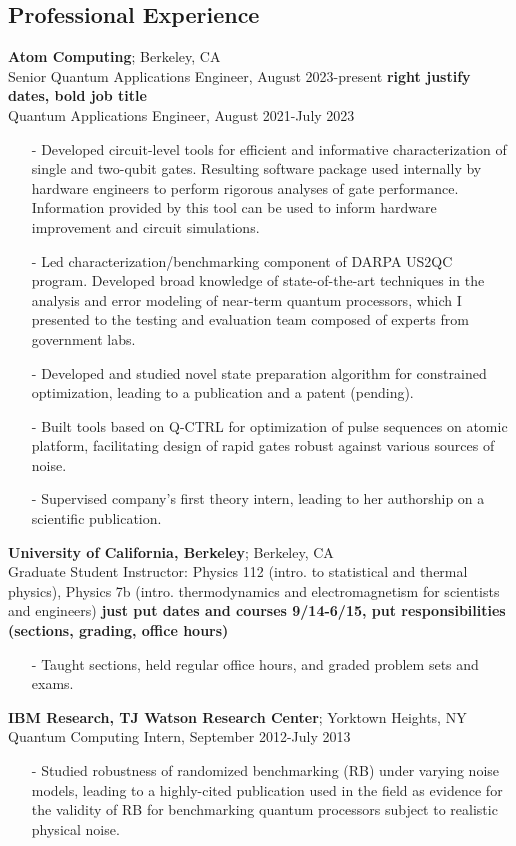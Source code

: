 \documentclass[]{article}
\begin{document}
\subsection*{Professional Experience}
\textbf{Atom Computing}; Berkeley, CA\\
Senior Quantum Applications Engineer, August 2023-present \textbf{\color{red}right justify dates, bold job title}\\
Quantum Applications Engineer, August 2021-July 2023
\begin{itemize}
\item[-] Developed circuit-level tools for efficient and informative characterization of single and two-qubit gates. Resulting software package used internally by hardware engineers to perform rigorous analyses of gate performance. Information provided by this tool can be used to inform hardware improvement and circuit simulations.
\item[-] Led characterization/benchmarking component of DARPA US2QC program. Developed broad knowledge of state-of-the-art techniques in the analysis and error modeling of near-term quantum processors, which I presented to the testing and evaluation team composed of experts from government labs.
\item[-] Developed and studied novel state preparation algorithm for constrained optimization, leading to a publication and a patent (pending).
\item[-] Built tools based on Q-CTRL for optimization of pulse sequences on atomic platform, facilitating design of rapid gates robust against various sources of noise.
\item[-] Supervised company's first theory intern, leading to her authorship on a scientific publication.
\end{itemize}
\vspace{6pt}
\noindent\textbf{University of California, Berkeley}; Berkeley, CA\\
Graduate Student Instructor: Physics 112 (intro. to statistical and thermal physics), Physics 7b (intro. thermodynamics and electromagnetism for scientists and engineers) \textbf{\color{red}just put dates and courses 9/14-6/15, put responsibilities (sections, grading, office hours)}
\begin{itemize}
\item[-] Taught sections, held regular office hours, and graded problem sets and exams.
\end{itemize}
\vspace{6pt}
\noindent\textbf{IBM Research, TJ Watson Research Center}; Yorktown Heights, NY\\
Quantum Computing Intern, September 2012-July 2013
\begin{itemize}
\item[-] Studied robustness of randomized benchmarking (RB) under varying noise models, leading to a highly-cited publication used in the field as evidence for the validity of RB for benchmarking quantum processors subject to realistic physical noise.
\end{itemize}
\end{document}
